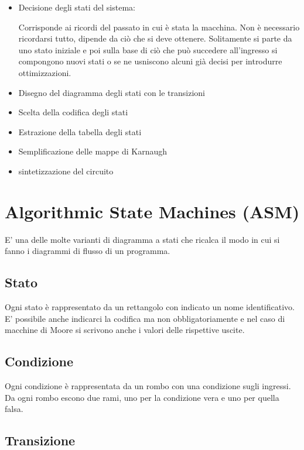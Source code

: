 \documentclass[a4paper]{book}
\begin{document}
\begin{itemize}
\item Decisione degli stati del sistema:

Corrisponde ai ricordi del passato in cui è stata la macchina. Non è necessario ricordarsi tutto, dipende da ciò che si deve ottenere.
Solitamente si parte da uno stato iniziale e poi sulla base di ciò che può succedere all'ingresso si compongono nuovi stati o se ne usniscono alcuni già decisi per introdurre ottimizzazioni.


\item Disegno del diagramma degli stati con le transizioni
\item Scelta della codifica degli stati
\item Estrazione della tabella degli stati
\item Semplificazione delle mappe di Karnaugh
\item sintetizzazione del circuito

\end{itemize}

\section{Algorithmic State Machines (ASM)}

E' una delle molte varianti di diagramma a stati che ricalca il modo in cui si fanno i diagrammi di flusso di un programma.

\subsection*{Stato}

Ogni stato è rappresentato da un rettangolo con indicato un nome identificativo.
E' possibile anche indicarci la codifica ma non obbligatoriamente e nel caso di macchine di Moore si scrivono anche i valori delle rispettive uscite.


\subsection*{Condizione}

Ogni condizione è rappresentata da un rombo con una condizione sugli ingressi.
Da ogni rombo escono due rami, uno per la condizione vera e uno per quella falsa.



\subsection*{Transizione}
\end{document}
